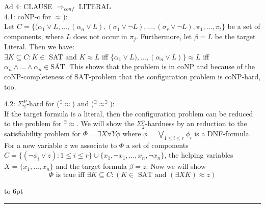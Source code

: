\documentclass[12pt]{article}
\newcommand{\AEQB}{\mbox{$^\exists\!\!\approx^\exists$}}
\newcommand{\AEQ}{\mbox{$^\exists\!\!\approx$}}
\newenvironment{proof}{\parindent=0pt{\bf Proof: }}{
   \hspace*{\fill}\hbox to 6pt{\leaders\hrule width 6pt height 6pt\hfill}\par}
\begin{document}
\begin{proof} Ad 4: CLAUSE $\Longrightarrow_{conf}$ LITERAL\\
4.1: coNP-c for $\approx$):\\
Let $C=\{(\alpha_1 \vee L, \ldots, (\alpha_n \vee L), (\sigma_1 \vee \neg L), \ldots, (\sigma_r \vee \neg L), \pi_1, \ldots, \pi_t\}$ be a set of components, where $L$ does not occur in $\pi_j$. Furthermore, let $\beta=L$ be the target Literal. Then we have:\\
$\exists K \subseteq C: K \in$ SAT and $K \approx L$ iff $\{\alpha_1 \vee L), \ldots, (\alpha_n \vee L)\} \approx L$
iff $\alpha_n \wedge \ldots \wedge \alpha_n \in \overline{\mbox{SAT}}$. This shows that the problem is in coNP and because of the coNP-completeness of $\overline{\mbox{SAT}}$-problem that the configuration problem is coNP-hard, too.



4.2: $\Sigma^P_2$-hard for (\AEQ) and (\AEQB):\\
If the target formula is a literal, then the configuration problem can be reduced to the problem for \AEQ.
We will show the $\Sigma^p_2$-hardness by an reduction to the satisfiability problem for
$\Phi= \exists X \forall Y \phi$ where $\phi = \bigvee_{1 \leq i \leq r} \phi_i$ is a DNF-formula.\\
For a new variable $z$ we associate to $\Phi$ a set of components
$C =\{(\neg \phi_i \vee z): 1 \leq i \leq r\} \cup \{x_1, \neg x_1, \ldots, x_n, \neg x_n\}$, the helping variables
$X= \{x_1, \ldots, x_n\}$ and the target formula $\beta=z$.
Now we will show
$$\Phi \mbox{ is true iff }  \exists K \subseteq C: (K \in \mbox{  SAT and } (\exists X K) \approx z)$$



\end{proof}
\end{document}
